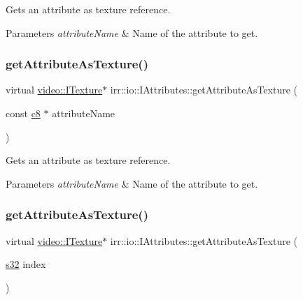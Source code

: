 Gets an attribute as texture reference. 


\begin{DoxyParams}{Parameters}
{\em attribute\+Name} & Name of the attribute to get. \\
\hline
\end{DoxyParams}
\mbox{\label{classirr_1_1io_1_1IAttributes_a2044beb7dcf310beb95ed0f4008f2b27}} 
\subsubsection{\texorpdfstring{get\+Attribute\+As\+Texture()}{getAttributeAsTexture()}\hspace{0.1cm}{\footnotesize\ttfamily [2/4]}}
{\footnotesize\ttfamily virtual \hyperlink{classirr_1_1video_1_1ITexture}{video\+::\+I\+Texture}$\ast$ irr\+::io\+::\+I\+Attributes\+::get\+Attribute\+As\+Texture (\begin{DoxyParamCaption}\item[{const \hyperlink{namespaceirr_a9395eaea339bcb546b319e9c96bf7410}{c8} $\ast$}]{attribute\+Name }\end{DoxyParamCaption})\hspace{0.3cm}{\ttfamily [pure virtual]}}



Gets an attribute as texture reference. 


\begin{DoxyParams}{Parameters}
{\em attribute\+Name} & Name of the attribute to get. \\
\hline
\end{DoxyParams}
\mbox{\label{classirr_1_1io_1_1IAttributes_ad022db880ccf7844c720efceef7c22fc}} 
\subsubsection{\texorpdfstring{get\+Attribute\+As\+Texture()}{getAttributeAsTexture()}\hspace{0.1cm}{\footnotesize\ttfamily [3/4]}}
{\footnotesize\ttfamily virtual \hyperlink{classirr_1_1video_1_1ITexture}{video\+::\+I\+Texture}$\ast$ irr\+::io\+::\+I\+Attributes\+::get\+Attribute\+As\+Texture (\begin{DoxyParamCaption}\item[{\hyperlink{namespaceirr_ac66849b7a6ed16e30ebede579f9b47c6}{s32}}]{index }\end{DoxyParamCaption})\hspace{0.3cm}{\ttfamily [pure virtual]}}



